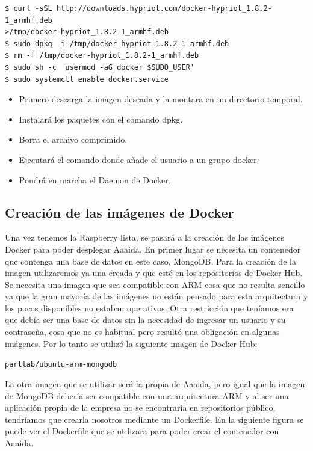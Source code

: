 \begin{verbatim}
$ curl -sSL http://downloads.hypriot.com/docker-hypriot_1.8.2-1_armhf.deb 
>/tmp/docker-hypriot_1.8.2-1_armhf.deb
$ sudo dpkg -i /tmp/docker-hypriot_1.8.2-1_armhf.deb
$ rm -f /tmp/docker-hypriot_1.8.2-1_armhf.deb
$ sudo sh -c 'usermod -aG docker $SUDO_USER'
$ sudo systemctl enable docker.service
\end{verbatim}

\begin{itemize}
\item Primero descarga la imagen deseada y la montara en un directorio temporal.
\item Instalará los paquetes con el comando dpkg.
\item Borra el archivo comprimido.
\item Ejecutará el comando donde añade el usuario a un grupo docker. 
\item Pondrá en marcha el Daemon de Docker.  
\end{itemize}


\subsection{Creación de las imágenes de Docker}

Una vez tenemos la Raspberry lista, se pasará a la creación de las imágenes Docker para poder desplegar Aaaida.
En primer lugar se necesita un contenedor que contenga una base de datos en este caso, MongoDB. Para la creación de la imagen utilizaremos ya una creada y que esté en los repositorios de Docker Hub. Se necesita una imagen que sea compatible con ARM cosa que no resulta sencillo ya que la gran mayoría de las imágenes no están pensado para esta arquitectura y los pocos disponibles no estaban operativos. Otra restricción que teníamos era que debía ser una base de datos sin la necesidad de ingresar un usuario y su contraseña, cosa que no es habitual pero resultó una obligación en algunas imágenes.
Por lo tanto se utilizó la siguiente imagen de Docker Hub:

\begin{center}
\texttt{partlab/ubuntu-arm-mongodb}
\end{center}

La otra imagen que se utilizar será la propia de Aaaida, pero igual que la imagen de MongoDB debería ser compatible con una arquitectura ARM y al ser una aplicación propia de la empresa no se encontraría en repositorios público, tendríamos que crearla nosotros mediante un Dockerfile. 
En la siguiente figura se puede ver el Dockerfile que se utilizara para poder crear el contenedor con Aaaida.

